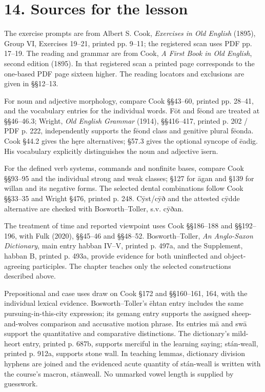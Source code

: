 \section*{14. Sources for the lesson}

The exercise prompts are from Albert S. Cook, \emph{Exercises in Old English} (1895), Group VI, Exercises 19–21, printed pp. 9–11; the registered scan uses PDF pp. 17–19. The reading and grammar are from Cook, \emph{A First Book in Old English}, second edition (1895). In that registered scan a printed page corresponds to the one-based PDF page sixteen higher. The reading locators and exclusions are given in §§12–13.

For noun and adjective morphology, compare Cook §§43–60, printed pp. 28–41, and the vocabulary entries for the individual words. Fōt and fēond are treated at §§46–46.3; Wright, \emph{Old English Grammar} (1914), §§416–417, printed p. 202 /\allowbreak{} PDF p. 222, independently supports the fēond class and genitive plural fēonda. Cook §44.2 gives the hęre alternatives; §57.3 gives the optional syncope of ēadig. His vocabulary explicitly distinguishes the noun and adjective īsern.

For the defined verb systems, commands and nonfinite bases, compare Cook §§93–95 and the individual strong and weak classes; §127 for āgan and §139 for willan and its negative forms. The selected dental combinations follow Cook §§33–35 and Wright §476, printed p. 248. Cȳst/\allowbreak{}cȳð and the attested cȳdde alternative are checked with Bosworth–Toller, s.v. cȳðan.

The treatment of time and reported viewpoint uses Cook §§186–188 and §§192–196, with Fulk (2020), §§45–46 and §§48–52. Bosworth–Toller, \emph{An Anglo-Saxon Dictionary}, main entry habban IV–V, printed p. 497a, and the Supplement, habban B, printed p. 493a, provide evidence for both uninflected and object-agreeing participles. The chapter teaches only the selected constructions described above.

Prepositional and case uses draw on Cook §172 and §§160–161, 164, with the individual lexical evidence. Bosworth–Toller’s ēhtan entry includes the same pursuing-in-this-city expression; its gemang entry supports the assigned sheep-and-wolves comparison and accusative motion phrase. Its entries mā and swā support the quantitative and comparative distinctions. The dictionary’s mild-heort entry, printed p. 687b, supports merciful in the learning saying; stán-weall, printed p. 912a, supports stone wall. In teaching lemmas, dictionary division hyphens are joined and the evidenced acute quantity of stán-weall is written with the course’s macron, stānweall. No unmarked vowel length is supplied by guesswork.

\endgroup

\par\label{end-ch12-learner}
\clearpage\endgroup
